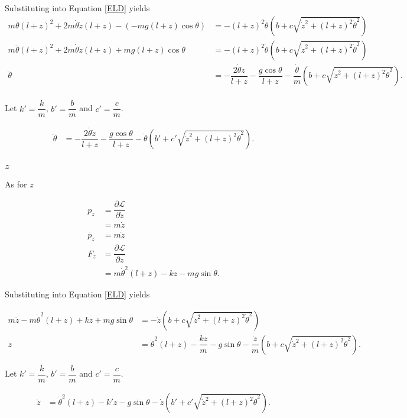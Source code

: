 \documentclass[12pt,a4paper,portrait]{article}
\newcommand{\lag}{\mathcal{L}}
\newcommand{\eq}[1]{Equation \eqref{#1}}
\begin{document}
Substituting into \eq{ELD} yields
\begin{align*}
	m\ddot{\theta} (l+z)^2 + 2m\dot{\theta}\dot{z}(l+z) - (-mg(l+z)\cos{\theta}) &= -(l+z)^2 \dot{\theta} \left(b+c\sqrt{\dot{z}^2+(l+z)^2\dot{\theta}^2}\right) \\
	m\ddot{\theta} (l+z)^2 + 2m\dot{\theta}\dot{z}(l+z) +mg(l+z)\cos{\theta} &= -(l+z)^2 \dot{\theta} \left(b+c\sqrt{\dot{z}^2+(l+z)^2\dot{\theta}^2}\right) \\
	\ddot{\theta} &= -\dfrac{2\dot{\theta}\dot{z}}{l+z} - \dfrac{g\cos{\theta}}{l+z} -\dfrac{\dot{\theta}}{m} \left(b+c\sqrt{\dot{z}^2+(l+z)^2\dot{\theta}^2}\right). \\
\end{align*}

Let $k'=\dfrac{k}{m}$, $b'=\dfrac{b}{m}$ and $c'=\dfrac{c}{m}$.

\begin{align*}
	\ddot{\theta} &= -\dfrac{2\dot{\theta}\dot{z}}{l+z} - \dfrac{g\cos{\theta}}{l+z} -\dot{\theta} \left(b'+c'\sqrt{\dot{z}^2+(l+z)^2\dot{\theta}^2}\right).
\end{align*}

\subsubsection{$z$}
As for $z$

\begin{align*}
	p_z &= \dfrac{\partial \lag}{\partial \dot{z}} \\
	&= m\dot{z} \\
	\dot{p_z} &= m\ddot{z} \\
	F_z &= \dfrac{\partial \lag}{\partial z} \\
	&= m\dot{\theta}^2(l+z) - kz - mg\sin{\theta}.
\end{align*}

Substituting into \eq{ELD} yields

\begin{align*}
	m\ddot{z} - m\dot{\theta}^2(l+z) + kz + mg\sin{\theta} &= -\dot{z}\left(b+c\sqrt{\dot{z}^2+(l+z)^2\dot{\theta}^2}\right) \\
	\ddot{z} &= \dot{\theta}^2(l+z) - \dfrac{kz}{m} - g\sin{\theta} -\dfrac{\dot{z}}{m}\left(b+c\sqrt{\dot{z}^2+(l+z)^2\dot{\theta}^2}\right).
\end{align*}

Let $k'=\dfrac{k}{m}$, $b'=\dfrac{b}{m}$ and $c'=\dfrac{c}{m}$.

\begin{align*}
	\ddot{z} &= \dot{\theta}^2(l+z) - k'z - g\sin{\theta} -\dot{z}\left(b'+c'\sqrt{\dot{z}^2+(l+z)^2\dot{\theta}^2}\right).
\end{align*}
\end{document}
